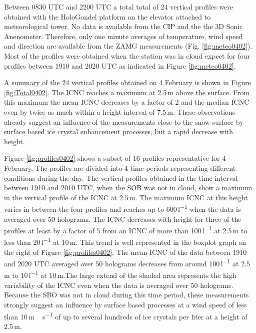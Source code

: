 \documentclass[draft,linenumbers]{agujournal}
\begin{document}
Between 0830 UTC and 2200 UTC a total total of 24 vertical profiles were obtained with the HoloGondel platform on the elevator attached to meteorological tower. No data is available from the CIP and the the 3D Sonic Anenometer. Therefore, only one minute averages of temperature, wind speed and direction are available from the ZAMG measurements (Fig. \ref{fig:meteo0402}). Most of the profiles were obtained when the station was in cloud expect for four profiles between 1910 and 2020 UTC as indicated in Figure \ref{fig:meteo0402}.

A summary of the 24 vertical profiles obtained on 4 February is shown in Figure \ref{fig:Total0402}. The ICNC reaches a maximum at 2.5\,\si{m} above the surface. From this maximum the mean ICNC decreases by a factor of 2 and the median ICNC even by twice as much within a height interval of 7.5\,\si{m}. These observations already suggest an influence of the measurements close to the snow surface by surface based ice crystal enhancement processes, but a rapid decrease with height.

Figure \ref{fig:profiles0402} shows a subset of 16 profiles representative for 4 February. The profiles are divided into 4 time periods representing different conditions during the day.  The vertical profiles obtained in the time interval between 1910 and 2010 UTC, when the SOB was not in cloud, show a maximum in the vertical profile of the ICNC at 2.5\,\si{m}. The maximum ICNC at this height varies in between the four profiles and reaches up to 600\,\si{l^{-1}} when the data is averaged over 50 holograms. The ICNC decreases with height for three of the profiles at least by a factor of 5 from an ICNC of more than 100\,\si{l^{-1}} at 2.5\,\si{m} to less than 20\,\si{l^{-1}} at 10\,\si{m}. This trend is well represented in the boxplot graph on the right of Figure \ref{fig:profiles0402}. The mean ICNC of the data between 1910 and 2020 UTC averaged over 50 holograms decreases from around 100\,\si{l^{-1}} at 2.5\,\si{m} to 10\,\si{l^{-1}} at 10\,\si{m}.The large extend of the shaded area represents the high variability of the ICNC even when the data is averaged over 50 holograms. Because the SBO was not in cloud during this time period, these measurements strongly suggest an influence by surface based processes at a wind speed of less than 10\,\si{m\,s^{-1}} of up to several hundreds of ice crystals per liter at a height of 2.5\,\si{m}.
\end{document}

